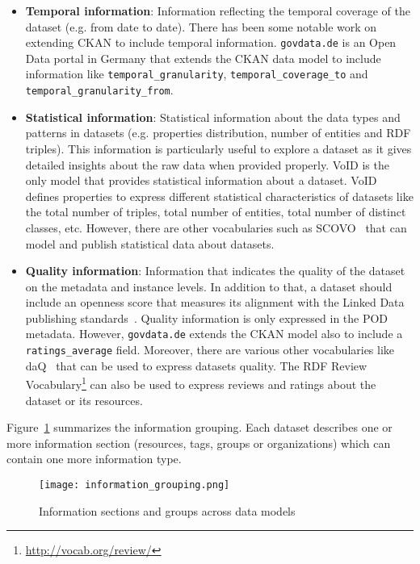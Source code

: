 \begin{itemize}
 \item \textbf{Temporal information}: Information reflecting the temporal coverage of the dataset (e.g. from date to date). There has been some notable work on extending CKAN to include temporal information. \texttt{govdata.de} is an Open Data portal in Germany that extends the CKAN data model to include information like \texttt{temporal\_granularity}, \texttt{temporal\_coverage\_to} and \\\texttt{temporal\_granularity\_from}.
 \item \textbf{Statistical information}: Statistical information about the data types and patterns in datasets (e.g. properties distribution, number of entities and RDF triples). This information is particularly useful to explore a dataset as it gives detailed insights about the raw data when provided properly. VoID is the only model that provides statistical information about a dataset. VoID defines properties to express different statistical characteristics of datasets like the total number of triples, total number of entities, total number of distinct classes, etc. However, there are other vocabularies such as SCOVO~\cite{Hausenblas:ESWC:09} that can model and publish statistical data about datasets.
 \item \textbf{Quality information}: Information that indicates the quality of the dataset on the metadata and instance levels. In addition to that, a dataset should include an openness score that measures its alignment with the Linked Data publishing standards~\cite{Berners-Lee:W3C:06}. Quality information is only expressed in the POD metadata. However, \texttt{govdata.de} extends the CKAN model also to include a \texttt{ratings\_average} field. Moreover, there are various other vocabularies like daQ~\cite{Debattista:WWW:14} that can be used to express datasets quality. The RDF Review Vocabulary\footnote{\url{http://vocab.org/review/}} can also be used to express reviews and ratings about the dataset or its resources.
\end{itemize}

Figure~\ref{fig:information_grouping} summarizes the information grouping. Each dataset describes one or more information section (resources, tags, groups or organizations) which can contain one more information type.

\begin{figure}[ht!]
\centering
	\texttt{[image: information\_grouping.png]}
	\caption{Information sections and groups across data models }
	\label{fig:information_grouping}
\end{figure}

